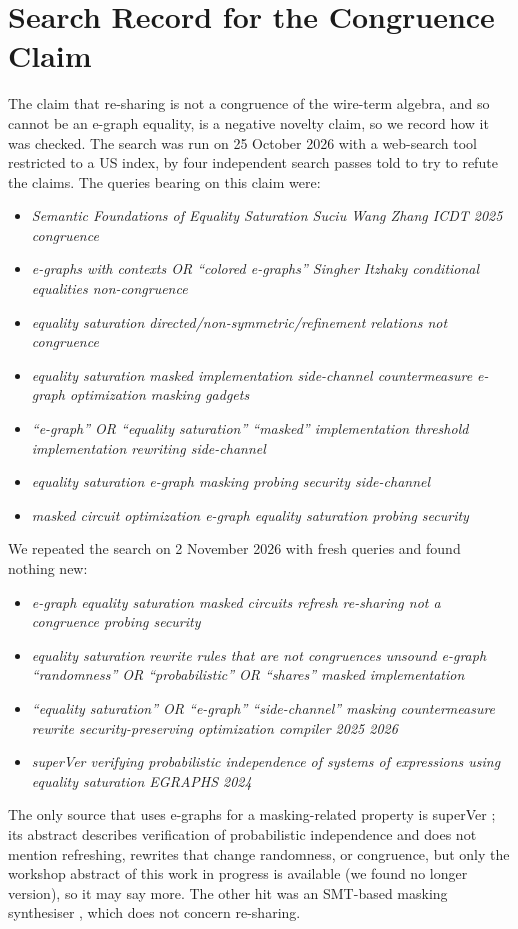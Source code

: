 \documentclass[conference]{IEEEtran}
\begin{document}
\section{Search Record for the Congruence Claim}\label{app:search}
The claim that re-sharing is not a congruence of the wire-term algebra, and so cannot be an e-graph equality, is a negative novelty claim, so we record how it was checked. The search was run on 25 October 2026 with a web-search tool restricted to a US index, by four independent search passes told to try to refute the claims. The queries bearing on this claim were:
\begin{itemize}
\item \emph{Semantic Foundations of Equality Saturation Suciu Wang Zhang ICDT 2025 congruence}
\item \emph{e-graphs with contexts OR ``colored e-graphs'' Singher Itzhaky conditional equalities non-congruence}
\item \emph{equality saturation directed/non-symmetric/refinement relations not congruence}
\item \emph{equality saturation masked implementation side-channel countermeasure e-graph optimization masking gadgets}
\item \emph{``e-graph'' OR ``equality saturation'' ``masked'' implementation threshold implementation rewriting side-channel}
\item \emph{equality saturation e-graph masking probing security side-channel}
\item \emph{masked circuit optimization e-graph equality saturation probing security}
\end{itemize}
We repeated the search on 2 November 2026 with fresh queries and found nothing new:
\begin{itemize}
\item \emph{e-graph equality saturation masked circuits refresh re-sharing not a congruence probing security}
\item \emph{equality saturation rewrite rules that are not congruences unsound e-graph ``randomness'' OR ``probabilistic'' OR ``shares'' masked implementation}
\item \emph{``equality saturation'' OR ``e-graph'' ``side-channel'' masking countermeasure rewrite security-preserving optimization compiler 2025 2026}
\item \emph{superVer verifying probabilistic independence of systems of expressions using equality saturation EGRAPHS 2024}
\end{itemize}
The only source that uses e-graphs for a masking-related property is superVer \cite{treff2024supver}; its abstract describes verification of probabilistic independence and does not mention refreshing, rewrites that change randomness, or congruence, but only the workshop abstract of this work in progress is available (we found no longer version), so it may say more. The other hit was an SMT-based masking synthesiser \cite{eldib2014masking}, which does not concern re-sharing.
\end{document}
